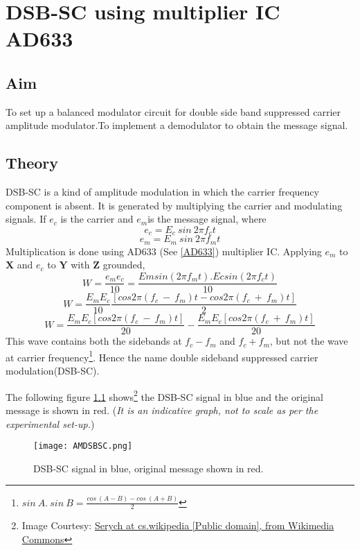\chapter[DSB-SC using multiplier IC AD633]{DSB-SC using multiplier IC AD633}
\label{chapdsbsc}
\section*{Aim}
To set up a balanced modulator circuit for double side band suppressed carrier amplitude modulator.To implement a demodulator to obtain the message signal.
\section*{Theory}
DSB-SC is a kind of amplitude modulation in which the carrier frequency component is absent. It is generated by multiplying the carrier and modulating signals. If $e_c$ is the carrier and $e_m$is the message signal, where
\begin{equation}
e_c=E_c\  sin\ 2\pi f_ct
\end{equation}
\begin{equation}
e_m=E_m\  sin\ 2\pi f_mt
\end{equation}
Multiplication is done using AD633 (See \ref{AD633}) multiplier IC.
Applying $e_m$ to $\textbf{X}$ and $e_c$ to $\textbf{Y}$ with $\textbf{Z}$ grounded, 
\begin{equation}
W= \frac{e_me_c}{10} =\frac{Emsin(2\pi f_mt).Ecsin(2\pi f_ct)}{10}
\end{equation}
\begin{equation}
W= \frac{E_mE_c}{10} \frac{[cos 2\pi (f_c\ -\ f_m)t-cos 2\pi (f_c\ +\ f_m)t]}{2}
\end{equation}
\begin{equation}
W= \frac{E_mE_c [cos 2\pi (f_c\ -\ f_m)t]}{20}- \frac{E_mE_c[cos 2\pi (f_c\ +\ f_m)t]}{20}
\end{equation}
This wave contains both the sidebands at $f_c-f_m$ and $f_c+f_m$, but not the wave at carrier frequency\footnote{$sin \ A.\ sin\ B=\frac{cos\ (A-B)-cos\ (A+B)}{2}$}. Hence the name double sideband suppressed carrier modulation(DSB-SC).

The following figure \ref{DSBSC} shows\footnote{Image Courtesy: \href{http://commons.wikimedia.org/wiki/File\%3AAM-DSBSC.png}{Serych at cs.wikipedia [Public domain], from Wikimedia Commons}} the DSB-SC signal in blue and the original message is shown in red. (\emph{It is an indicative graph, not to scale as per the experimental set-up.})
\begin{figure}[h]
\begin{center}
\texttt{[image: AMDSBSC.png]}
\caption{DSB-SC signal in blue, original message shown in red.}
\label{DSBSC}
\end{center}

\end{figure}

